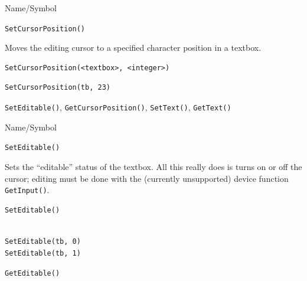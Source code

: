 \begin{desc}{Name/Symbol}
\item[Name/Symbol] 	\verb+SetCursorPosition()+

\item[Description] 	Moves the editing cursor to a specified character
		position in a textbox.

\item[Usage]
\begin{verbatim}
SetCursorPosition(<textbox>, <integer>)
\end{verbatim}

\item[Example]
\begin{verbatim}
SetCursorPosition(tb, 23)
\end{verbatim}

\item[See Also]   	\verb+SetEditable()+, \verb+GetCursorPosition()+, \verb+SetText()+, \verb+GetText()+
\end{desc}



\begin{desc}{Name/Symbol}
\item[Name/Symbol] 	\verb+SetEditable()+

\item[Description] Sets the ``editable'' status of the textbox.  All
  this really does is turns on or off the cursor; editing must be done
  with the (currently unsupported) device function \verb+GetInput()+.

\item[Usage] 
\begin{verbatim}
SetEditable()
\end{verbatim}

\item[Example]
\begin{verbatim}

SetEditable(tb, 0)
SetEditable(tb, 1)
\end{verbatim}

\item[See Also]    	\verb+GetEditable()+
\end{desc}


